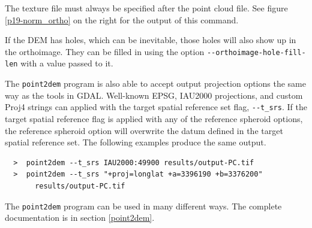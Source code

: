 The texture file must always be specified after the point cloud
file. See figure \ref{p19-norm_ortho} on the right for the output of
this command.

If the DEM has holes, which can be inevitable, those holes will also
show up in the orthoimage. They can be filled in using the option
\texttt{-\/-orthoimage-hole-fill-len} with a value passed to it.

The \texttt{point2dem} program is also able to accept output
projection options the same way as the tools in GDAL. Well-known EPSG,
IAU2000 projections, and custom Proj4 strings can applied with the
target spatial reference set flag, \texttt{-\/-t\_srs}. If the target
spatial reference flag is applied with any of the reference spheroid
options, the reference spheroid option will overwrite the datum
defined in the target spatial reference set. The following examples
produce the same output.

\begin {verbatim}
  >  point2dem --t_srs IAU2000:49900 results/output-PC.tif
  >  point2dem --t_srs "+proj=longlat +a=3396190 +b=3376200"
       results/output-PC.tif
\end{verbatim}

The \texttt{point2dem} program can be used in many different ways. The
complete documentation is in section \ref{point2dem}.

